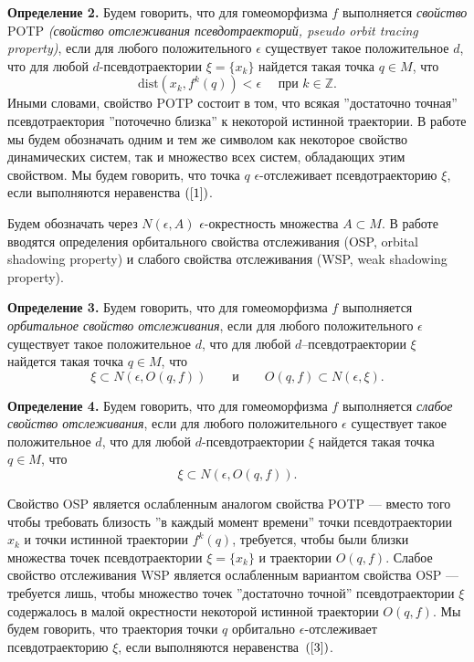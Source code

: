 \documentclass[12pt]{article}
\begin{document}
\textbf{Определение 2.} Будем говорить, что для гомеоморфизма $f$ выполняется \textit{свойство} POTP \textit{(свойство отслеживания псевдотраекторий, pseudo orbit tracing property)}, если для любого положительного $\epsilon$ существует такое положительное $d$, что для любой $d$-псевдотраектории $\xi=\{x_k\}$ найдется такая точка $q\in M$, что
\begin{equation}
\label{1}
\mbox{dist}(x_k,f^k(q))< \epsilon\quad\mbox{ при }k\in\mathbb{Z}.
\end{equation}
Иными словами, свойство POTP состоит в том, 
что всякая ''достаточно точная'' псевдотраектория ''поточечно близка'' к некоторой истинной траектории. В работе мы будем обозначать одним и тем же символом как некоторое свойство динамических систем, так и множество всех систем, обладающих этим свойством.
Мы будем говорить, что точка $q$ $\epsilon$-отслеживает псевдотраекторию $\xi$, если выполняются неравенства $(\ref{1})$.

Будем обозначать через $N(\epsilon,A)$ $\epsilon$-окрестность множества $A\subset M$. 
В работе \cite{3} вводятся определения орбитального свойства отслеживания (OSP, orbital shadowing property) и слабого свойства отслеживания (WSP, weak shadowing property).

\textbf{Определение 3.} Будем говорить, что для гомеоморфизма $f$  выполняется \textit{орбитальное свойство отслеживания}, если для любого положительного $\epsilon$ существует такое положительное $d$, что для любой $d$--псевдотраек\-тории $\xi$ найдется такая точка $q\in M$, что
\begin{equation}
\label{3}
\xi\subset N(\epsilon,O(q,f))\qquad\mbox{и}\qquad O(q,f)\subset N(\epsilon,\xi).
\end{equation}

\textbf{Определение 4.} Будем говорить, что для гомеоморфизма $f$ выполняется \textit{слабое свойство отслеживания}, если для любого положительного $\epsilon$ существует такое положительное $d$, что для любой $d$-псевдотраектории $\xi$ найдется такая точка $q\in M$, что
$$\xi\subset N(\epsilon,O(q,f)).$$

Свойство OSP является ослабленным аналогом свойства POTP --- вместо того чтобы требовать близость ''в каждый момент времени'' точки псевдотраектории $x_k$ и точки истинной траектории $f^k(q)$, требуется, 
чтобы были близки множества точек 
псевдотраектории $\xi=\{x_k\}$ и траектории $O(q,f)$. Слабое свойство отслеживания WSP является ослабленным вариантом свойства OSP --- требуется лишь, чтобы множество точек ''достаточно точной'' псевдотраектории $\xi$ содержалось в малой окрестности некоторой истинной траектории $O(q,f)$. 
Мы будем говорить, что траектория точки $q$ орбитально $\epsilon$-отслеживает псевдотраекторию $\xi$, если выполняются неравенства~$(\ref{3})$.
\end{document}
